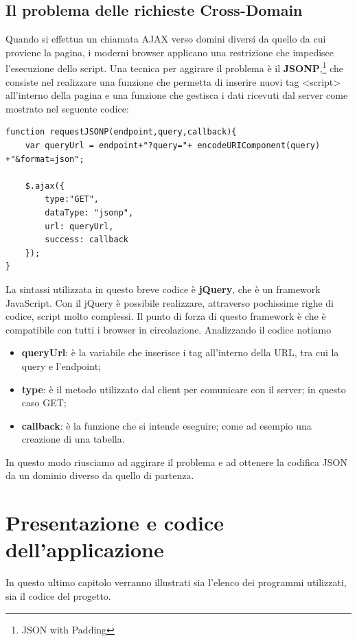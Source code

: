 \documentclass[a4paper,11pt]{article}
\begin{document}
\subsection{Il problema delle richieste Cross-Domain}
\label{sec:5.4}
Quando si effettua un chiamata AJAX verso domini diversi da quello da cui proviene la pagina, i moderni browser applicano una restrizione che impedisce l'esecuzione dello script.
Una tecnica per aggirare il problema è il \textbf{JSONP},\footnote{JSON with Padding} che consiste nel realizzare una funzione che permetta di inserire nuovi tag <script> all'interno della pagina e una funzione che gestisca i dati ricevuti dal server come mostrato nel seguente codice:

\begin{lstlisting}[style=htmlcssjs]
function requestJSONP(endpoint,query,callback){
	var queryUrl = endpoint+"?query="+ encodeURIComponent(query) +"&format=json";
	
	$.ajax({
       	type:"GET",
       	dataType: "jsonp",  
        url: queryUrl,
        success: callback
    });
}
\end{lstlisting}
La sintassi utilizzata in questo breve codice è \textbf{jQuery}, che è un framework JavaScript.
Con il jQuery è possibile realizzare, attraverso pochissime righe di codice, script molto complessi. Il punto di forza di questo framework è che è compatibile con tutti i browser in circolazione. \newline
Analizzando il codice notiamo
\begin{itemize}
\item \textbf{queryUrl}: è la variabile che inserisce i tag all'interno della URL, tra cui la query e l'endpoint;
\item \textbf{type}: è il metodo utilizzato dal client per comunicare con il server; in questo caso GET;
\item \textbf{callback}: è la funzione che si intende eseguire; come ad esempio una creazione di una tabella.
\end{itemize}

In questo modo riusciamo ad aggirare il problema e ad ottenere la codifica JSON da un dominio diverso da quello di partenza.
\newpage
\section{Presentazione e codice dell'applicazione}
\label{sec:6}
In questo ultimo capitolo verranno illustrati sia l'elenco dei programmi utilizzati, sia il codice del progetto.
\end{document}
